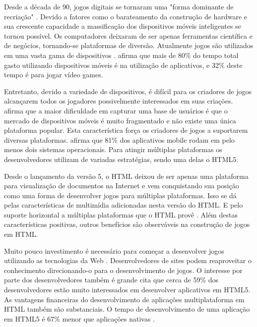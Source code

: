 \setcounter{page}{10}

Desde a década de 90, jogos digitais se tornaram uma "forma dominante
de recriação" \autocite{gameDesignPatterns}. Devido a fatores
como o barateamento da construção de hardware e sua crescente
capacidade a massificação dos dispositivos móveis inteligentes
se tornou possível. Os computadores deixaram de ser apenas
ferramentas científica e de negócios, tornando-se plataformas de
diversão. Atualmente jogos são utilizados em uma vasta gama de
dispositivos \citet[p. 6]{crossPlatformMobileGameDevelopment}.
\citet{HTML5CrossPlatformGameDevelopment} afirma que mais de 80\% do
tempo total gasto utilizando dispositivos móveis é na utilização de
aplicativos, e 32\% deste tempo é para jogar vídeo games.

Entretanto, devido a variedade de dispositivos, é difícil para
os criadores de jogos alcançarem todos os jogadores possivelmente
interessados em suas criações. \citet{html5Tradeoffs} afirma que a
maior dificuldade em capturar uma base de usuários é que o mercado
de dispositivos móveis é muito fragmentado e não existe uma única
plataforma popular. Esta característica força os criadores de jogos a
suportarem diversas plataformas. \citet{htmlSurvey} afirma que 81\% dos
aplicativos mobile rodam em pelo menos dois sistemas operacionais. Para
atingir múltiplas plataformas os desenvolvedores utilizam de variadas
estratégias, sendo uma delas o HTML5.

Desde o lançamento da versão 5, o HTML deixou de ser apenas uma
plataforma para visualização de documentos na Internet e vem
conquistando sua posição como uma forma de desenvolver jogos
para múltiplas plataformas. Isso se dá pelas características de
multimídia adicionadas nesta versão do HTML. E pelo suporte horizontal
a múltiplas plataformas que o HTML provê \autocite{html5Tradeoffs}.
Além destas características positivas, outros benefícios são
observáveis na construção de jogos em HTML.

Muito pouco investimento é necessário para começar a desenvolver
jogos utilizando as tecnologias da Web \autocite{html5mostwanted}.
Desenvolvedores de sites podem reaproveitar o conhecimento
direcionando-o para o desenvolvimento de jogos. O interesse por
parte dos desenvolvedores também é grande \autocite{htmlSurvey}
cita que cerca de 59\% dos desenvolvedores estão muito interessados
em desenvolver aplicativos em HTML5. As vantagens financeiras do
desenvolvimento de aplicações multiplataforma em HTML também são
substanciais. O tempo de desenvolvimento de uma aplicação em HTML5 é
67\% menor que aplicações nativas \autocite[p. 460]{html5Tradeoffs}.

